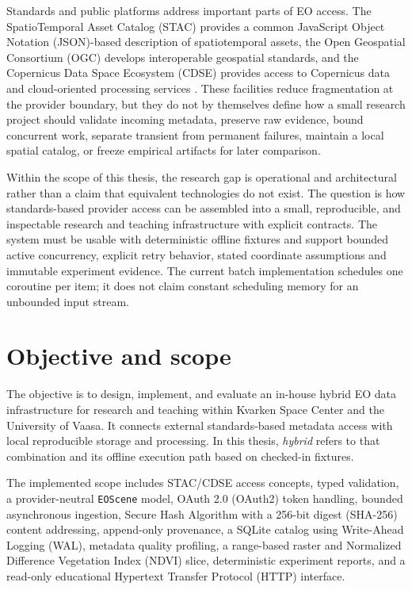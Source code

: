 Standards and public platforms address important parts of EO access. The SpatioTemporal Asset
Catalog (STAC) provides a common JavaScript Object Notation (JSON)-based description of spatiotemporal assets, the Open
Geospatial Consortium (OGC) develops interoperable geospatial standards, and the Copernicus
Data Space Ecosystem (CDSE) provides access to Copernicus data and cloud-oriented processing
services \citep{ogc-api-features,stac-spec,cdse,kovacs2026cdse}. These facilities reduce
fragmentation at the provider boundary, but they do not by themselves define how a small
research project should validate incoming metadata, preserve raw evidence, bound concurrent
work, separate transient from permanent failures, maintain a local spatial catalog, or freeze
empirical artifacts for later comparison.

Within the scope of this thesis, the research gap is operational and architectural rather than a claim that equivalent technologies do not exist. The question is how standards-based provider access can be assembled into a small, reproducible, and inspectable research and teaching infrastructure with explicit contracts. The system must be usable with deterministic offline fixtures and support bounded active concurrency, explicit retry behavior, stated coordinate assumptions and immutable experiment evidence. The current batch implementation schedules one coroutine per item; it does not claim constant scheduling memory for an unbounded input stream.

\section{Objective and scope}

The objective is to design, implement, and evaluate an in-house hybrid EO data infrastructure
for research and teaching within Kvarken Space Center and the University of Vaasa. It connects
external standards-based metadata access with local reproducible storage and processing. In
this thesis, \emph{hybrid} refers to that combination and its offline execution path based on
checked-in fixtures.

The implemented scope includes STAC/CDSE access concepts, typed validation, a provider-neutral \texttt{EOScene} model, OAuth 2.0 (OAuth2) token handling, bounded asynchronous ingestion, Secure Hash Algorithm with a 256-bit digest (SHA-256) content addressing, append-only provenance, a SQLite catalog using Write-Ahead Logging (WAL), metadata quality profiling, a range-based raster and Normalized Difference Vegetation Index (NDVI) slice, deterministic experiment reports, and a read-only educational Hypertext Transfer Protocol (HTTP) interface.

